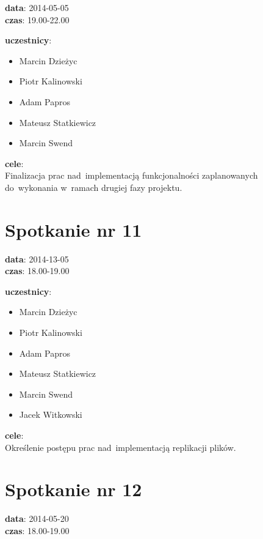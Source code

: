 \noindent
\textbf{data}: 2014-05-05 \\
\textbf{czas}: 19.00-22.00

\vspace{5mm}
\noindent
\textbf{uczestnicy}:
\begin{itemize}
	\item Marcin Dzieżyc
	\item Piotr Kalinowski
	\item Adam Papros
	\item Mateusz Statkiewicz
	\item Marcin Swend
\end{itemize}

\vspace{5mm}
\noindent
\textbf{cele}: \\
Finalizacja prac nad~implementacją funkcjonalności zaplanowanych do~wykonania
w~ramach drugiej fazy projektu.

\section[Spotkanie nr 11][Spotkanie nr 11]{Spotkanie nr 11}

\noindent
\textbf{data}: 2014-13-05 \\
\textbf{czas}: 18.00-19.00

\vspace{5mm}
\noindent
\textbf{uczestnicy}:
\begin{itemize}
	\item Marcin Dzieżyc
	\item Piotr Kalinowski
	\item Adam Papros
	\item Mateusz Statkiewicz
	\item Marcin Swend
	\item Jacek Witkowski
\end{itemize}

\vspace{5mm}
\noindent
\textbf{cele}: \\
Określenie postępu prac nad~implementacją replikacji plików.

\section[Spotkanie nr 12][Spotkanie nr 12]{Spotkanie nr 12}

\noindent
\textbf{data}: 2014-05-20 \\
\textbf{czas}: 18.00-19.00

